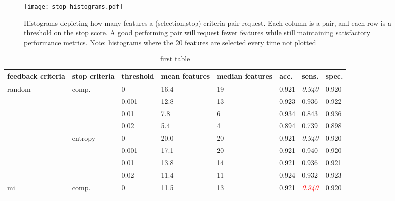 \begin{figure}[h]
	\centering
	\texttt{[image: stop\_histograms.pdf]}
	\caption{Histograms depicting how many features a (selection,stop) criteria pair request. Each column is a pair, and each row is a threshold on the stop score. A good performing pair will request fewer features while still maintaining satisfactory performance metrics. Note: histograms where the 20 features are selected every time not plotted}
	\label{fig:feedback_stop_histograms}
\end{figure}


\begin{table}[]
	\centering
	\caption{first table}
	\label{my-label}
	\begin{tabularx}{\textwidth}{|X|X|X|X|X|X|X|X|}
		\hline
		feedback criteria        & stop criteria            & threshold & mean features & median features  & acc.           & sens.                & spec.          \\ \hline
		\multirow{8}{*}{random}  & \multirow{4}{*}{comp.}   & 0         & 16.4          & 19               & 0.921          & \textit{0.940}       & 0.920          \\ \cline{3-8} 
		&                          & 0.001     & 12.8          & 13               & 0.923          & 0.936                & 0.922          \\ \cline{3-8} 
		&                          & 0.01      & 7.8           & 6                & 0.934          & 0.843                & 0.936          \\ \cline{3-8} 
		&                          & 0.02      & 5.4           & 4                & 0.894          & 0.739                & 0.898          \\ \cline{2-8} 
		& \multirow{4}{*}{entropy} & 0         & 20.0          & 20               & 0.921          & \textit{0.940}       & 0.920          \\ \cline{3-8} 
		&                          & 0.001     & 17.1          & 20               & 0.921          & 0.940                & 0.920          \\ \cline{3-8} 
		&                          & 0.01      & 13.8          & 14               & 0.921          & 0.936                & 0.921          \\ \cline{3-8} 
		&                          & 0.02      & 11.4          & 11               & 0.924          & 0.932                & 0.923          \\ \hline
		\multirow{8}{*}{mi}      & \multirow{4}{*}{comp.}   & 0         & 11.5          & 13               & 0.921          & \textcolor{red}{\textit{0.940}} & 0.920          \\ \cline{3-8} 

\end{tabularx}
\end{table}
